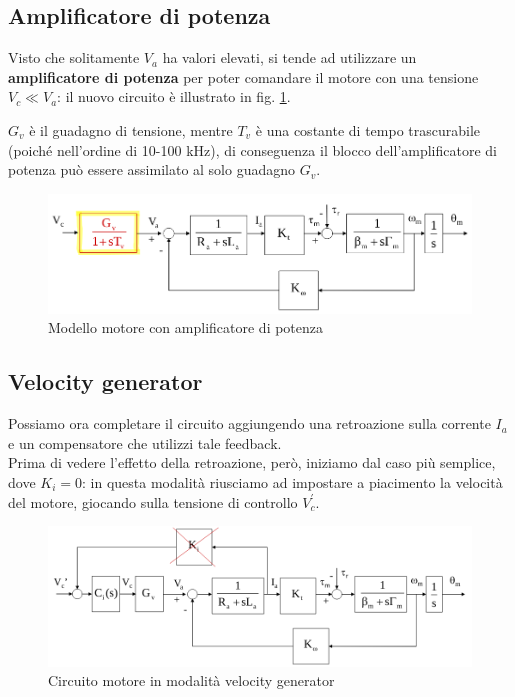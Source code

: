 \subsection{Amplificatore di potenza}
Visto che solitamente $V_a$ ha valori elevati, si tende ad utilizzare un \textbf{amplificatore di potenza} per poter comandare il motore con una tensione $V_c \ll V_a$: il nuovo circuito è illustrato in fig. \ref{fig:electricactuator2}. 

$G_v$ è il guadagno di tensione, mentre $T_v$ è una costante di tempo trascurabile (poiché nell’ordine di 10-100 kHz), di conseguenza il blocco dell’amplificatore di potenza può essere assimilato al solo guadagno $G_v$.


\begin{figure}[th!]
	\centering
	\includegraphics[width=0.7\linewidth]{images/electric_actuator_2}
	\caption{Modello motore con amplificatore di potenza}
	\label{fig:electricactuator2}
\end{figure}




\subsection{Velocity generator}

Possiamo ora completare il circuito aggiungendo una retroazione sulla corrente $I_a$ e un compensatore che utilizzi tale feedback. \\
Prima di vedere l'effetto della retroazione, però, iniziamo dal caso più semplice, dove $K_i = 0$: in questa modalità riusciamo ad impostare a piacimento la velocità del motore, giocando sulla tensione di controllo $V_c^{'}$.

\begin{figure}[H]
	\centering
	\includegraphics[width=0.7\linewidth]{images/electric_actuator_4}
	\caption{Circuito motore in modalità velocity generator}
	\label{fig:electricactuator4}
\end{figure}

